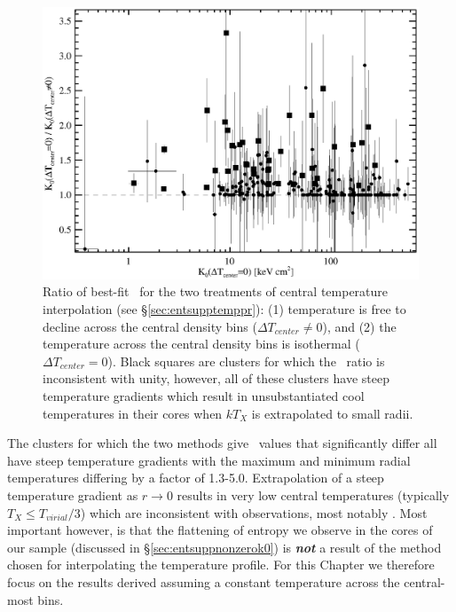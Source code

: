\begin{figure}[htp]
  \begin{center}
    \begin{minipage}[htp]{\linewidth}
      \includegraphics*[width=\textwidth, trim=5mm 0mm 5mm 5mm, clip]{itplflat_rat}
      \caption[Ratio of best-fit \kna\ for temperature interpolation
        schemes.]{Ratio of best-fit \kna\ for the two treatments of
        central temperature interpolation (see
        \S\ref{sec:entsupptemppr}): (1) temperature is free to decline
        across the central density bins ($\Delta T_{center} \ne 0$),
        and (2) the temperature across the central density bins is
        isothermal ($\Delta T_{center} = 0$). Black squares are clusters
        for which the \kna\ ratio is inconsistent with unity, however,
        all of these clusters have steep temperature gradients which
        result in unsubstantiated cool temperatures in their cores
        when $kT_X$ is extrapolated to small radii.}
      \label{fig:kcomp}
    \end{minipage}
  \end{center}
\end{figure}

The clusters for which the two methods give \kna\ values that
significantly differ all have steep temperature gradients with the
maximum and minimum radial temperatures differing by a factor of
1.3-5.0. Extrapolation of a steep temperature gradient as $r
\rightarrow 0$ results in very low central temperatures (typically
$T_X \leq T_{virial}/3$) which are inconsistent with observations,
most notably \citet{peterson03}. Most important however, is that the
flattening of entropy we observe in the cores of our sample (discussed
in \S\ref{sec:entsuppnonzerok0}) is {\bfseries\em{not}} a result of the
method chosen for interpolating the temperature profile. For this
Chapter we therefore focus on the results derived assuming a constant
temperature across the central-most bins.

